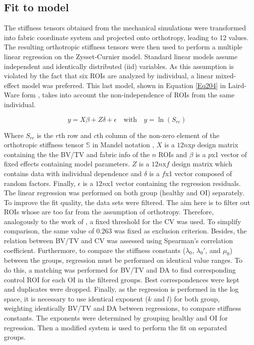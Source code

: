 \documentclass[a4paper,fleqn]{DC_ArtStyle}
\begin{document}
\subsection{Fit to model}
The stiffness tensors obtained from the mechanical simulations were transformed into fabric coordinate system and projected onto orthotropy, leading to 12 values. The resulting orthotropic stiffness tensors were then used to perform a multiple linear regression on the Zysset-Curnier model. Standard linear models assume independent and identically distributed (iid) variables. As this assumption is violated by the fact that six ROIs are analyzed by individual, a linear mixed-effect model was preferred. This last model, shown in Equation \ref{Eq204} in Laird-Ware form \cite{Laird1982}, takes into account the non-independence of ROIs from the same individual. 

\begin{equation}
	y = X \beta + Z \delta + \epsilon \quad \text{with} \quad y = \ln(S_{rc})
	\label{Eq204}
\end{equation}

Where $S_{rc}$ is the $r$th row and $c$th column of the non-zero element of the orthotropic stiffness tensor $\mathbb{S}$ in Mandel notation \cite{MANDEL1965}, $X$ is a $12n$x$p$ design matrix containing the the BV/TV and fabric info of the $n$ ROIs and $\beta$ is a $p$x1 vector of fixed effects containing model parameters. $Z$ is a $12n$x$f$ design matrix which contains data with individual dependence and $\delta$ is a $f$x1 vector composed of random factors. Finally, $\epsilon$ is a $12n$x1 vector containing the regression residuals.\\

The linear regression was performed on both group (healthy and OI) separately. To improve the fit quality, the data sets were filtered. The aim here is to filter out ROIs whose are too far from the assumption of orthotropy. Therefore, analogously to the work of \citeauthor{Panyasantisuk2015}\cite{Panyasantisuk2015}, a fixed threshold for the CV was used. To simplify comparison, the same value of 0.263 was fixed as exclusion criterion. Besides, the relation between BV/TV and CV was assessed using Spearman's correlation coefficient. Furthermore, to compare the stiffness constants ($\lambda_0$, $\lambda_0'$, and $\mu_0$) between the groups, regression must be performed on identical value ranges. To do this, a matching was performed for BV/TV and DA to find corresponding control ROI for each OI in the filtered groups. Best correspondences were kept and duplicates were dropped. Finally, as the regression is performed in the log space, it is necessary to use identical exponent ($k$ and $l$) for both group, weighting identically BV/TV and DA between regressions, to compare stiffness constants. The exponents were determined by grouping healthy and OI for regression. Then a modified system is used to perform the fit on separated groups.\\
\end{document}
